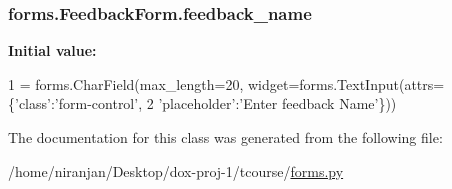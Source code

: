 \subsubsection[{\texorpdfstring{feedback\+\_\+name}{feedback_name}}]{\setlength{\rightskip}{0pt plus 5cm}forms.\+Feedback\+Form.\+feedback\+\_\+name\hspace{0.3cm}{\ttfamily [static]}}\hypertarget{classforms_1_1_feedback_form_a489414513306b7666bb4a9249ff2ad16}{}\label{classforms_1_1_feedback_form_a489414513306b7666bb4a9249ff2ad16}
{\bfseries Initial value\+:}
\begin{DoxyCode}
1 = forms.CharField(max\_length=20, widget=forms.TextInput(attrs=\{\textcolor{stringliteral}{'class'}:\textcolor{stringliteral}{'form-control'},
2                                                                                 \textcolor{stringliteral}{'placeholder'}:\textcolor{stringliteral}{'Enter
       feedback Name'}\}))
\end{DoxyCode}


The documentation for this class was generated from the following file\+:\begin{DoxyCompactItemize}
\item 
/home/niranjan/\+Desktop/dox-\/proj-\/1/tcourse/\hyperlink{forms_8py}{forms.\+py}\end{DoxyCompactItemize}
